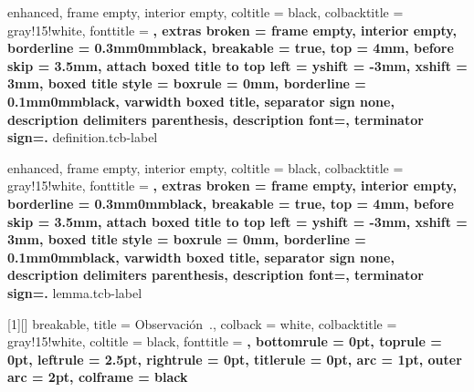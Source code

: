 {
    enhanced,
    frame empty,
    interior empty,
    coltitle = black,
    colbacktitle = gray!15!white,
    fonttitle = \bfseries,
    extras broken = {frame empty, interior empty},
    borderline = {0.3mm}{0mm}{black},
    breakable = true,
    top = 4mm,
    before skip = 3.5mm,
    attach boxed title to top left = {yshift = -3mm, xshift = 3mm},
    boxed title style = {boxrule = 0mm, borderline = {0.1mm}{0mm}{black}},
    varwidth boxed title,
    separator sign none, description delimiters parenthesis,
    description font=\bfseries,
    terminator sign={.\hspace{1mm}}
}
{definition.tcb-label}

{
    enhanced,
    frame empty,
    interior empty,
    coltitle = black,
    colbacktitle = gray!15!white,
    fonttitle = \bfseries,
    extras broken = {frame empty, interior empty},
    borderline = {0.3mm}{0mm}{black},
    breakable = true,
    top = 4mm,
    before skip = 3.5mm,
    attach boxed title to top left = {yshift = -3mm, xshift = 3mm},
    boxed title style = {boxrule = 0mm, borderline = {0.1mm}{0mm}{black}},
    varwidth boxed title,
    separator sign none, description delimiters parenthesis,
    description font=\bfseries,
    terminator sign={.\hspace{1mm}}
}
{lemma.tcb-label}

[1][]
{
    breakable,
    title = Observación~\thetcbcounter.,
    colback = white,
    colbacktitle = gray!15!white,
    coltitle = black,
    fonttitle = \bfseries,
    bottomrule = 0pt,
    toprule = 0pt,
    leftrule = 2.5pt,
    rightrule = 0pt,
    titlerule = 0pt,
    arc = 1pt,
    outer arc = 2pt,
    colframe = black
}


\newenvironment{section-theorem.tcb}[1][]
{
    \ifstrempty{#1}
    {
        \begin{tcb-theorem-style}{}{}
    }
    {
        \begin{tcb-theorem-style}{#1}{}
    }
    }{
    \end{tcb-theorem-style}
}

\newenvironment{section-problem.tcb}
{
    \begin{tcb-problem-style}{}{}
    }{
    \end{tcb-problem-style}
}

\newenvironment{section-example.tcb}[1][]
{
    \ifstrempty{#1}
    {
        \begin{tcb-example-style}{}{}
    }
    {
        \begin{tcb-example-style}{#1}{}
    }
    }{
    \end{tcb-example-style}
}

